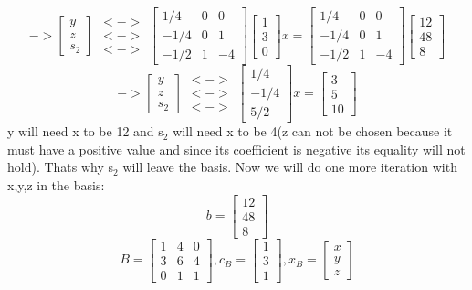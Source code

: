 \[->
\begin{bmatrix}
y\\
z\\
s_2
\end{bmatrix}
\begin{matrix}
<->\\
<->\\
<->
\end{matrix}
\begin{bmatrix}
1/4  &0&0\\
-1/4 &0&1\\
-1/2 &1&-4
\end{bmatrix}
\begin{bmatrix}
1\\
3\\
0
\end{bmatrix}
x=\begin{bmatrix}
1/4  &0&0\\
-1/4 &0&1\\
-1/2 &1&-4
\end{bmatrix}
\begin{bmatrix}
12\\
48\\
8
\end{bmatrix}
\]
\[->
\begin{bmatrix}
y\\
z\\
s_2
\end{bmatrix}
\begin{matrix}
<->\\
<->\\
<->
\end{matrix}
\begin{bmatrix}
1/4\\
-1/4\\
5/2
\end{bmatrix}
x=
\begin{bmatrix}
3\\
5\\
10
\end{bmatrix}
\]
y will need x to be 12 and s$_2$ will need x to be 4(z can not be chosen because it must have a positive value and since its coefficient is negative its equality will not hold). Thats why s$_2$ will leave the basis. Now we will do one more iteration with x,y,z in the basis:
\[
b=\begin{bmatrix}
12\\
48\\
8
\end{bmatrix}
\]
\[
B=\begin{bmatrix}
1&4&0\\
3&6&4\\
0&1&1
\end{bmatrix}
,c_B=\begin{bmatrix}
1\\
3\\
1
\end{bmatrix}
,x_B=\begin{bmatrix}
x\\
y\\
z
\end{bmatrix}
\]
